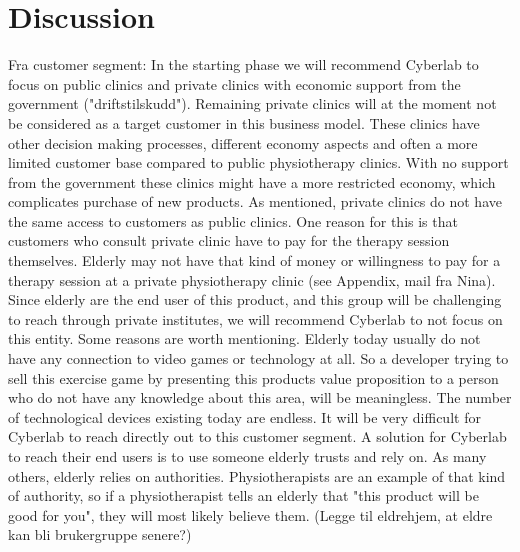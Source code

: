 \section{Discussion}
Fra customer segment: In the starting phase we will recommend Cyberlab to focus on public clinics and private clinics with economic support from the government ("driftstilskudd"). Remaining private clinics will at the moment not be considered as a target customer in this business model. These clinics have other decision making processes, different economy aspects and often a more limited customer base compared to public physiotherapy clinics. With no support from the government these clinics might have a more restricted economy, which complicates purchase of new products. As mentioned, private clinics do not have the same access to customers as public clinics. One reason for this is that customers who consult private clinic have to pay for the therapy session themselves. Elderly may not have that kind of money or willingness to pay for a therapy session at a private physiotherapy clinic (see Appendix, mail fra Nina). Since elderly are the end user of this product, and this group will be challenging to reach through private institutes, we will recommend Cyberlab to not focus on this entity. Some reasons are worth mentioning. Elderly today usually do not have any connection to video games or technology at all. So a developer trying to sell this exercise game by presenting this products value proposition to a person who do not have any knowledge about this area, will be meaningless. The number of technological devices existing today are endless. It will be very difficult for Cyberlab to reach directly out to this customer segment. A solution for Cyberlab to reach their end users is to use someone elderly trusts and rely on. As many others, elderly relies on authorities. Physiotherapists are an example of that kind of authority, so if a physiotherapist tells an elderly that "this product will be good for you", they will most likely believe them. (Legge til eldrehjem, at eldre kan bli brukergruppe senere?)